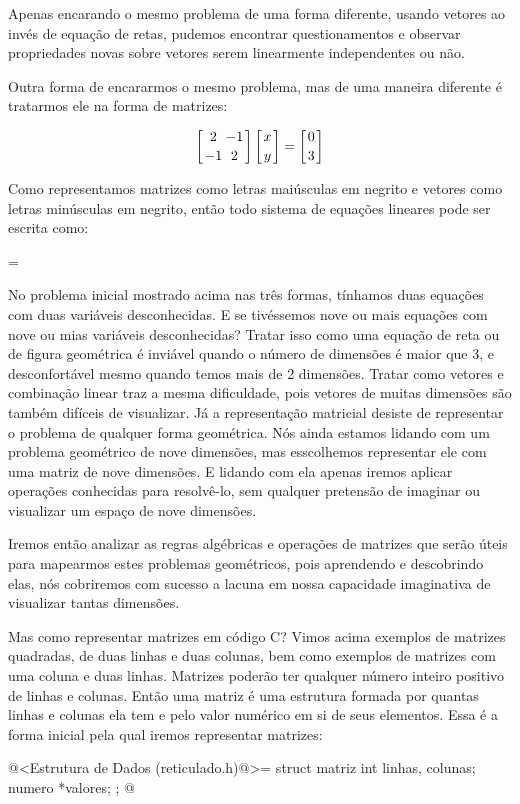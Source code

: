 Apenas encarando o mesmo problema de uma forma diferente, usando
vetores ao invés de equação de retas, pudemos encontrar
questionamentos e observar propriedades novas sobre vetores serem
linearmente independentes ou não.

Outra forma de encararmos o mesmo problema, mas de uma maneira
diferente é tratarmos ele na forma de matrizes:

$$
\left[{2 \atop -1}{-1\atop 2}\right]\left[{x\atop y}\right]=\left[{0\atop 3}\right]
$$

Como representamos matrizes como letras mai\-ús\-cu\-las em negrito e
vetores como letras mi\-nús\-cu\-las em negrito, então todo sistema de
equações lineares pode ser escrita como:

=

No problema inicial mostrado acima nas três formas, tínhamos duas
equações com duas variáveis desconhecidas. E se tivéssemos nove ou
mais equações com nove ou mias variáveis desconhecidas? Tratar isso
como uma equação de reta ou de figura geométrica é inviável quando o
número de dimensões é maior que 3, e desconfortável mesmo quando temos
mais de 2 dimensões. Tratar como vetores e combinação linear traz a
mesma dificuldade, pois vetores de muitas dimensões são também
difíceis de visualizar. Já a representação matricial desiste de
representar o problema de qualquer forma geométrica. Nós ainda estamos
lidando com um problema geométrico de nove dimensões, mas esscolhemos
representar ele com uma matriz de nove dimensões. E lidando com ela
apenas iremos aplicar operações conhecidas para resolvê-lo, sem
qualquer pretensão de imaginar ou visualizar um espaço de nove
dimensões.

Iremos então analizar as regras algébricas e operações de matrizes que
serão úteis para mapearmos estes problemas geométricos, pois
aprendendo e descobrindo elas, nós cobriremos com sucesso a lacuna em
nossa capacidade imaginativa de visualizar tantas dimensões.

Mas como representar matrizes em código C? Vimos acima exemplos de
matrizes quadradas, de duas linhas e duas colunas, bem como exemplos
de matrizes com uma coluna e duas linhas. Matrizes poderão ter
qualquer número inteiro positivo de linhas e colunas. Então uma matriz
é uma estrutura formada por quantas linhas e colunas ela tem e pelo
valor numérico em si de seus elementos. Essa é a forma inicial pela
qual iremos representar matrizes:

\iniciocodigo
@<Estrutura de Dados (reticulado.h)@>=
struct matriz{
  int linhas, colunas;
  numero *valores;
};
@
\fimcodigo

